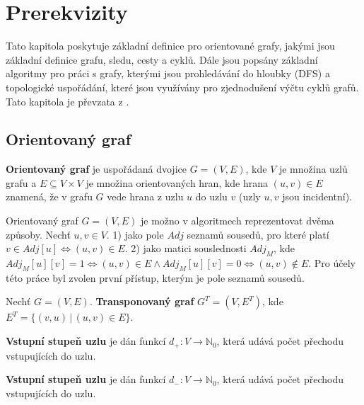 \chapter{Prerekvizity}
    \label{chapter:Intro}
    Tato kapitola poskytuje základní definice pro orientované grafy, jakými jsou základní definice grafu, sledu, cesty a cyklů. Dále jsou popsány základní algoritmy pro práci s grafy, kterými jsou prohledávání do hloubky (DFS) a topologické uspořádání, které jsou využívány pro zjednodušení výčtu cyklů grafů. Tato kapitola je převzata z \cite{Prezentace}.

    \section{Orientovaný graf}
        \begin{definition}
            \textbf{Orientovaný graf} je uspořádaná dvojice $G = (V, E)$, kde $V$ je množina uzlů grafu a $E \subseteq V \times V$ je množina orientovaných hran, kde hrana $(u, v) \in E$ znamená, že v grafu $G$ vede hrana z uzlu $u$ do uzlu $v$ (uzly $u, v$ jsou incidentní).\\
        \end{definition}

        Orientovaný graf $G = (V, E)$ je možno v algoritmech reprezentovat dvěma způsoby. Nechť $u, v \in V$. 1) jako pole $Adj$ seznamů sousedů, pro které platí $v \in Adj[u] \iff (u, v) \in E$. 2) jako matici souslednosti $Adj_M$, kde $Adj_M[u][v] = 1 \iff (u, v) \in E \land Adj_M[u][v] = 0 \iff (u, v) \notin E$. Pro účely této práce byl zvolen první přístup, kterým je pole seznamů sousedů.

        \begin{definition}
            Nechť $G = (V, E)$. \textbf{Transponovaný graf} $G^T = (V, E^T)$, kde $E^T = \{(v, u)\,|\, (u, v) \in E\}$.
        \end{definition}

        \begin{definition}
            \textbf{Vstupní stupeň uzlu} je dán funkcí $d_+ : V \rightarrow \mathbb{N}_0$, která udává počet přechodu vstupujících do uzlu.
        \end{definition}

        \begin{definition}
            \textbf{Vstupní stupeň uzlu} je dán funkcí $d_- : V \rightarrow \mathbb{N}_0$, která udává počet přechodu vstupujících do uzlu.\\
        \end{definition}

